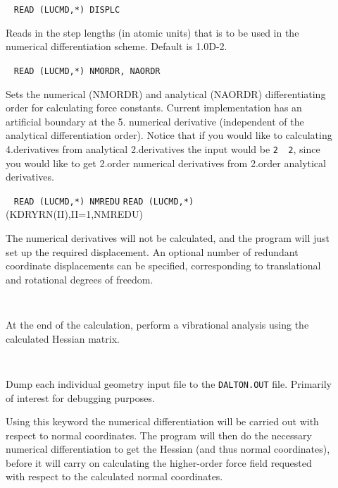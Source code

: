 \begin{description}

\item[]\verb| |\newline
\verb|READ (LUCMD,*) DISPLC|

Reads in the step lengths (in atomic units) that is to be used in the
numerical differentiation scheme. Default is 1.0D-2.

\item[]\verb| |\newline
\verb|READ (LUCMD,*) NMORDR, NAORDR|

Sets the numerical (NMORDR) and analytical (NAORDR) differentiating
order for calculating force constants. Current implementation has an
artificial boundary at the 5. numerical derivative (independent of the
analytical differentiation order). Notice that if you would like to
calculating 4.derivatives from analytical 2.derivatives the input
would be \verb|2  2|, since you would like to get 2.order numerical
derivatives from 2.order analytical derivatives.

\item[]\verb| |\newline
\verb|READ (LUCMD,*) NMREDU|\newline
\verb|READ (LUCMD,*)| (KDRYRN(II),II=1,NMREDU)

The numerical derivatives will not be calculated, and the program will
just set up the required displacement. An optional number of redundant
coordinate displacements can be specified, corresponding to translational and
rotational degrees of freedom.

\item[]\verb| |\newline

At the end of the calculation, perform a vibrational analysis using
the calculated Hessian matrix.

\item[]\verb| |\newline

Dump each individual geometry input file to the \verb|DALTON.OUT|
file. Primarily of interest for debugging purposes.

\item[]
Using this keyword the numerical differentiation will be carried out
with respect to normal coordinates. The program will then do the
necessary numerical differentiation to get the Hessian (and thus
normal coordinates), before it will carry on calculating the
higher-order force field requested with respect to the calculated normal
coordinates. 


\end{description}
